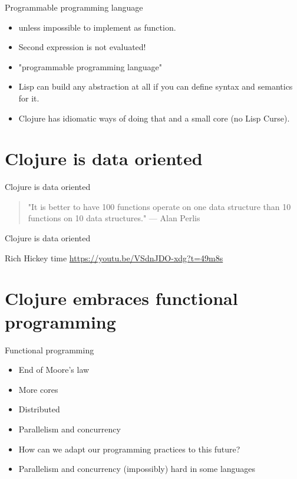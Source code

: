 \documentclass[presentation]{beamer}
\begin{document}
\begin{frame}[label=sec-1-6]{Programmable programming language}
\begin{itemize}
\item \alert{unless} impossible to implement as function.
\item Second expression is not evaluated!
\item "programmable programming language"
\item Lisp can build any abstraction at all if you can define syntax and semantics for it.
\item Clojure has idiomatic ways of doing that and a small core (no Lisp Curse).
\end{itemize}
\end{frame}

\section{Clojure is data oriented}
\label{sec-2}

\begin{frame}[label=sec-2-1]{Clojure is data oriented}
\begin{quotation}
"It is better to have 100 functions operate on one data structure than 10 functions on 10 data structures." --- Alan Perlis
\end{quotation}
\end{frame}

\begin{frame}[label=sec-2-2]{Clojure is data oriented}
\begin{alertblock}{Rich Hickey time}
\url{https://youtu.be/VSdnJDO-xdg?t=49m8s}
\end{alertblock}
\end{frame}

\section{Clojure embraces functional programming}
\label{sec-3}

\begin{frame}[label=sec-3-1]{Functional programming}
\begin{itemize}
\item End of Moore's law
\item More cores
\item Distributed
\item Parallelism and concurrency
\item How can we adapt our programming practices to this future?
\item Parallelism and concurrency (impossibly) hard in some languages
\end{itemize}
\end{frame}
\end{document}
